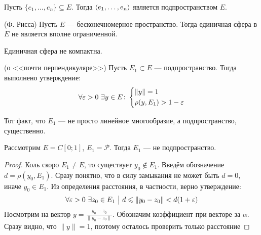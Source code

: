 \begin{theorem}
	Пусть $\{e_1, \ldots, e_n\} \subseteq E$. Тогда $\left\langle e_1, \ldots, e_n\right\rangle$ является подпространством $E$.
\end{theorem}

\begin{theorem} (Ф. Рисса)
	Пусть $E$ --- бесконечномерное пространство. Тогда единичная сфера в $E$ не является вполне ограниченной.
\end{theorem}

\begin{corollary}
	Единичная сфера не компактна.
\end{corollary}

\begin{lemma} (о <<почти перпендикуляре>>)
	Пусть $E_1 \subset E$ --- подпространство. Тогда выполнено утверждение:
	\[
		\forall \varepsilon > 0\ \exists y \in E \colon \left\{ \begin{aligned} 
			&{\|y\| = 1}
			\\
			&{\rho(y, E_1) > 1 - \varepsilon}
		 \end{aligned} \right.
	\]
\end{lemma}

\begin{note}
	Тот факт, что $E_1$ --- не просто линейное многообразие, а подпространство, существенно.
	
	Рассмотрим $E = C[0; 1]$, $E_1 = \mathcal{P}$. Тогда $E_1$ --- не подпространство.
\end{note}

\begin{proof}
	Коль скоро $E_1 \neq E$, то существует $y_0 \notin E_1$. Введём обозначение $d = \rho(y_0, E_1)$. Сразу понятно, что в силу замыкания не может быть $d = 0$, иначе $y_0 \in E_1$. Из определения расстояния, в частности, верно утверждение:
	\[
		\forall \varepsilon > 0\ \exists z_0 \in E_1 \ \big|\  d \leqslant \|y_0 - z_0\| < d(1 + \varepsilon)
	\]
	Посмотрим на вектор $y = \frac{y_0 - z_0}{\|y_0 - z_0\|}$. Обозначим коэффициент при векторе за $\alpha$. Сразу видно, что $\|y\| = 1$, поэтому осталось проверить только расстояние 
\end{proof}